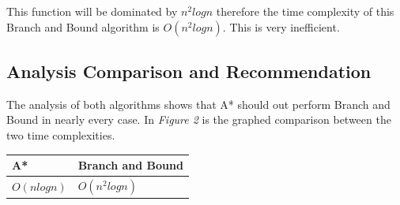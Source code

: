 \documentclass[12pt, letterpaper, final, onecolumn, titlepage] {article}
\begin{document}
\noindent This function will be dominated by \begin{math} n^2logn \end{math} therefore the time complexity of this Branch and Bound algorithm is \begin{math} O(n^2logn) \end{math}.  This is very inefficient.

\newpage

\subsection{Analysis Comparison and Recommendation}

\noindent The analysis of both algorithms shows that A* should out perform Branch and Bound in nearly every case.  In \textit{Figure 2} is the graphed comparison between the two time complexities.

\vspace{0.7cm}

\begin{minipage}{\linewidth} %
\end{minipage}

\vspace{0.7cm}

\begin{center}
\begin{tabular}{|p{4cm}|p{4cm}|}
\hline
\textbf{A*} & \textbf{Branch and Bound} \\
\hline
\begin{math}O(nlogn)\end{math} & \begin{math}O(n^2logn)\end{math} \\
\hline
\end{tabular}
\end{center}
\end{document}

